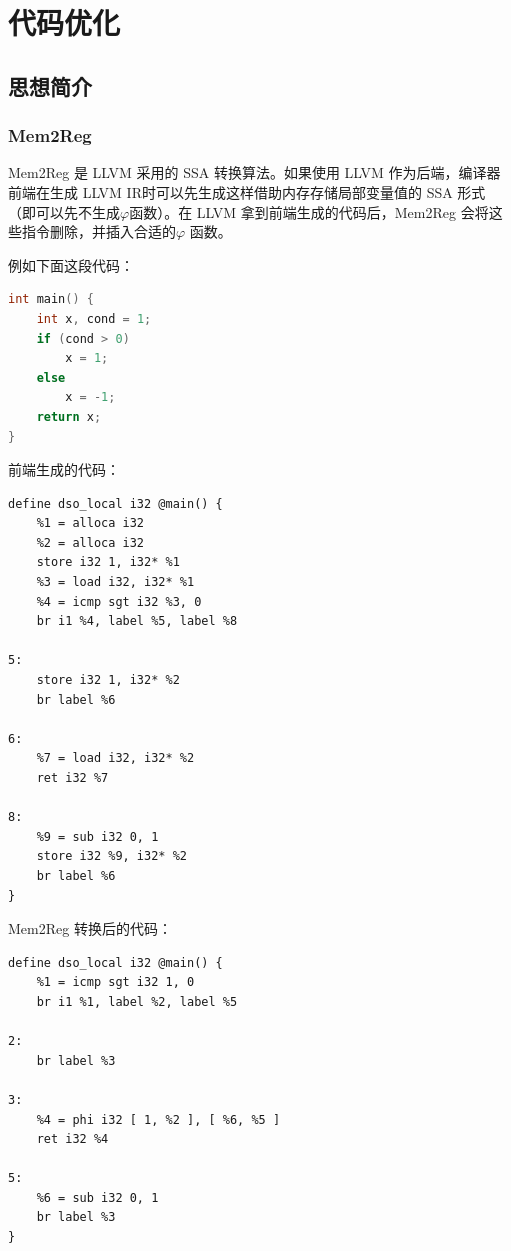\documentclass[UTF8,a4paper,10pt]{ctexart}
\begin{document}









\newpage

\section{代码优化}
\subsection{思想简介}
\subsubsection{Mem2Reg}
Mem2Reg 是 LLVM 采用的 SSA 转换算法。如果使用 LLVM 作为后端，编译器前端在生成 LLVM IR时可以先生成这样借助内存存储局部变量值的 SSA 形式（即可以先不生成$\varphi$函数）。在 LLVM 拿到前端生成的代码后，Mem2Reg 会将这些指令删除，并插入合适的$\varphi$ 函数。

例如下面这段代码：
\begin{lstlisting}[title = 样例函数, language = c++]
int main() {
    int x, cond = 1;
    if (cond > 0)
        x = 1;
    else
        x = -1;
    return x;
}
\end{lstlisting}

前端生成的代码：
\begin{lstlisting}[title = 中间代码]
define dso_local i32 @main() {
    %1 = alloca i32
    %2 = alloca i32
    store i32 1, i32* %1
    %3 = load i32, i32* %1
    %4 = icmp sgt i32 %3, 0
    br i1 %4, label %5, label %8

5:
    store i32 1, i32* %2
    br label %6

6:
    %7 = load i32, i32* %2
    ret i32 %7

8:
    %9 = sub i32 0, 1
    store i32 %9, i32* %2
    br label %6
}
\end{lstlisting}

Mem2Reg 转换后的代码：
\begin{lstlisting}[title = 转换]
define dso_local i32 @main() {
    %1 = icmp sgt i32 1, 0
    br i1 %1, label %2, label %5

2:
    br label %3

3:
    %4 = phi i32 [ 1, %2 ], [ %6, %5 ]
    ret i32 %4

5:
    %6 = sub i32 0, 1
    br label %3
}
\end{lstlisting}
\end{document}
